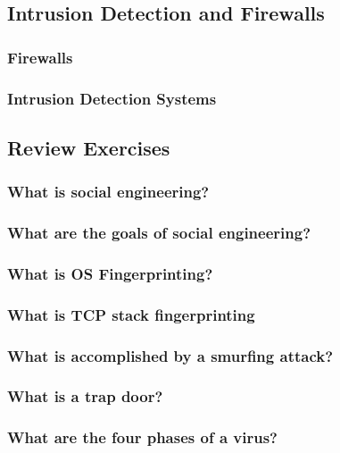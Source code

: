 \documentclass[a4paper, 10 pt, conference]{ieeeconf}
\begin{document}
\subsection{\textbf{Intrusion Detection and Firewalls}}

\subsubsection{\textbf{Firewalls}}

\subsubsection{\textbf{Intrusion Detection Systems}}



\subsection{\textbf{Review Exercises}}
\subsubsection{\textbf{What is social engineering?}}

\subsubsection{\textbf{What are the goals of social engineering?}}

\subsubsection{\textbf{What is OS Fingerprinting?}}

\subsubsection{\textbf{What is TCP stack fingerprinting}}

\subsubsection{\textbf{What is accomplished by a smurfing attack?}}

\subsubsection{\textbf{What is a trap door?}}

\subsubsection{\textbf{What are the four phases of a virus?}}
\end{document}
